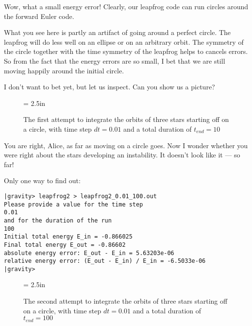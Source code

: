 \abc

\bob
Wow, what a small energy error!  Clearly, our leapfrog code can run
circles around the forward Euler code.

\alice
What you see here is partly an artifact of going around a perfect
circle.  The leapfrog will do less well on an ellipse or on an
arbitrary orbit.  The symmetry of the circle together with the time
symmetry of the leapfrog helps to cancels errors.  So from the fact
that the energy errors are so small, I bet that we are still moving
happily around the initial circle.

\carol
I don't want to bet yet, but let us inspect.  Can you show us a
picture?

\cba

\begin{figure}[htb]
\begin{center}
\epsfxsize = 2.5in
\caption[Three stars on a circle, leapfrog, $dt = 0.01$, $t_{end} = 10$]
{The first attempt to integrate the orbits of three stars
starting off on a circle, with time step $dt = 0.01$ and a total
duration of $t_{end} = 10$}
\label{fig:leap2-0.01-10}
\end{center}
\end{figure}

\abc

\bob
You are right, Alice, as far as moving on a circle goes.  Now I wonder
whether you were right about the stars developing an instability.  It
doesn't look like it --- so far!

\alice
Only one way to find out:

\cba

\begin{small}
\begin{verbatim}
|gravity> leapfrog2 > leapfrog2_0.01_100.out
Please provide a value for the time step
0.01
and for the duration of the run
100
Initial total energy E_in = -0.866025
Final total energy E_out = -0.86602
absolute energy error: E_out - E_in = 5.63203e-06
relative energy error: (E_out - E_in) / E_in = -6.5033e-06
|gravity>
\end{verbatim}
\end{small}

\begin{figure}[htb]
\begin{center}
\epsfxsize = 2.5in
\caption[Three stars on a circle, leapfrog, $dt = 0.01$, $t_{end} = 100$]
{The second attempt to integrate the orbits of three stars
starting off on a circle, with time step $dt = 0.01$ and a total
duration of $t_{end} = 100$}
\label{fig:leap2-0.01-100}
\end{center}
\end{figure}

